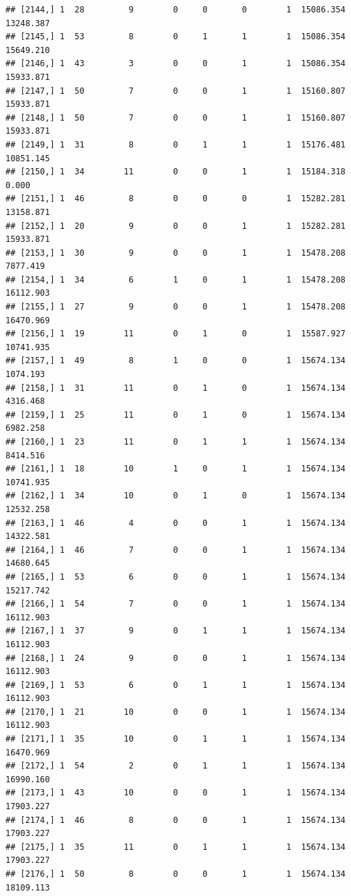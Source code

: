 \documentclass[
]{article}
\begin{document}
\begin{verbatim}
## [2144,] 1  28         9        0     0       0        1  15086.354  13248.387
## [2145,] 1  53         8        0     1       1        1  15086.354  15649.210
## [2146,] 1  43         3        0     0       1        1  15086.354  15933.871
## [2147,] 1  50         7        0     0       1        1  15160.807  15933.871
## [2148,] 1  50         7        0     0       1        1  15160.807  15933.871
## [2149,] 1  31         8        0     1       1        1  15176.481  10851.145
## [2150,] 1  34        11        0     0       1        1  15184.318      0.000
## [2151,] 1  46         8        0     0       0        1  15282.281  13158.871
## [2152,] 1  20         9        0     0       1        1  15282.281  15933.871
## [2153,] 1  30         9        0     0       1        1  15478.208   7877.419
## [2154,] 1  34         6        1     0       1        1  15478.208  16112.903
## [2155,] 1  27         9        0     0       1        1  15478.208  16470.969
## [2156,] 1  19        11        0     1       0        1  15587.927  10741.935
## [2157,] 1  49         8        1     0       0        1  15674.134   1074.193
## [2158,] 1  31        11        0     1       0        1  15674.134   4316.468
## [2159,] 1  25        11        0     1       0        1  15674.134   6982.258
## [2160,] 1  23        11        0     1       1        1  15674.134   8414.516
## [2161,] 1  18        10        1     0       1        1  15674.134  10741.935
## [2162,] 1  34        10        0     1       0        1  15674.134  12532.258
## [2163,] 1  46         4        0     0       1        1  15674.134  14322.581
## [2164,] 1  46         7        0     0       1        1  15674.134  14680.645
## [2165,] 1  53         6        0     0       1        1  15674.134  15217.742
## [2166,] 1  54         7        0     0       1        1  15674.134  16112.903
## [2167,] 1  37         9        0     1       1        1  15674.134  16112.903
## [2168,] 1  24         9        0     0       1        1  15674.134  16112.903
## [2169,] 1  53         6        0     1       1        1  15674.134  16112.903
## [2170,] 1  21        10        0     0       1        1  15674.134  16112.903
## [2171,] 1  35        10        0     1       1        1  15674.134  16470.969
## [2172,] 1  54         2        0     1       1        1  15674.134  16990.160
## [2173,] 1  43        10        0     0       1        1  15674.134  17903.227
## [2174,] 1  46         8        0     0       1        1  15674.134  17903.227
## [2175,] 1  35        11        0     1       1        1  15674.134  17903.227
## [2176,] 1  50         8        0     0       1        1  15674.134  18109.113

\end{verbatim}
\end{document}
